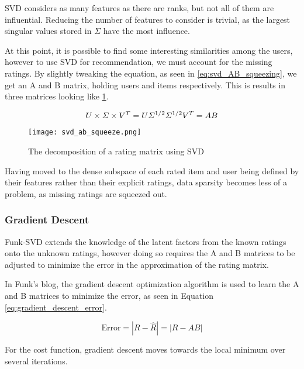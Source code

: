SVD considers as many features as there are ranks, but not all of them are influential. Reducing the number of features to consider is trivial, as the largest singular values stored in $\Sigma$ have the most influence.

At this point, it is possible to find some interesting similarities among the users, however to use SVD for recommendation, we must account for the missing ratings. By slightly tweaking the equation, as seen in \ref{eq:svd_AB_squeezing}, we get an A and B matrix, holding users and items respectively. This is results in three matrices looking like \ref{fig:svd-ab-squeeze}.

\begin{equation} \label{eq:svd_AB_squeezing}
	\centering
	U\times \Sigma \times V^T = U\Sigma^{1/2} \Sigma^{1/2}V^T = AB
\end{equation}

\begin{figure} [H] \label{fig:svd-ab-squeeze}
	\centering
	\texttt{[image: svd\_ab\_squeeze.png]}
	\caption{The decomposition of a rating matrix using SVD}
\end{figure}
Having moved to the dense subspace of each rated item and user being defined by their features rather than their explicit ratings, data sparsity becomes less of a problem, as missing ratings are squeezed out.

\subsubsection{Gradient Descent}
Funk-SVD extends the knowledge of the latent factors from the known ratings onto the unknown ratings, however doing so requires the A and B matrices to be adjusted to minimize the error in the approximation of the rating matrix.

In Funk's blog, the gradient descent optimization algorithm is used to learn the A and B matrices to minimize the error, as seen in Equation \ref{eq:gradient_descent_error}.

\begin{equation}\label{eq:gradient_descent_error}
\text{Error} = |R-\hat{R}| = |R - AB|
\end{equation}

For the cost function, gradient descent moves towards the local minimum over several iterations.

